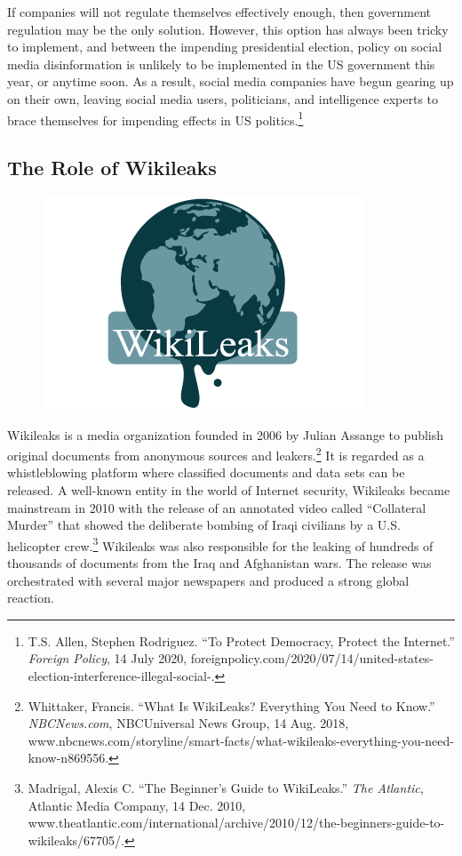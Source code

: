\documentclass[10pt, letterpaper]{article}
\begin{document}
If companies will not regulate themselves effectively enough, then
government regulation may be the only solution. However, this option has
always been tricky to implement, and between the impending presidential
election, policy on social media disinformation is unlikely to be
implemented in the US government this year, or anytime soon. As a
result, social media companies have begun gearing up on their own,
leaving social media users, politicians, and intelligence experts to
brace themselves for impending effects in US politics.\footnote{T.S.
  Allen, Stephen Rodriguez. ``To Protect Democracy, Protect the
  Internet.'' \emph{Foreign Policy}, 14 July 2020,
  foreignpolicy.com/2020/07/14/united-states-election-interference-illegal-social-.} \\

\subsection{The Role of Wikileaks}

\begin{figure}
\centering
\includegraphics[scale = 0.55]{image2.png}
\end{figure}

Wikileaks is a media organization founded in 2006 by Julian Assange to
publish original documents from anonymous sources and
leakers.\footnote{Whittaker, Francis. ``What Is WikiLeaks? Everything
  You Need to Know.'' \emph{NBCNews.com}, NBCUniversal News Group, 14
  Aug. 2018,
  www.nbcnews.com/storyline/smart-facts/what-wikileaks-everything-you-need-know-n869556.}
It is regarded as a whistleblowing platform where classified documents
and data sets can be released. A well-known entity in the world of
Internet security, Wikileaks became mainstream in 2010 with the release
of an annotated video called ``Collateral Murder'' that showed the
deliberate bombing of Iraqi civilians by a U.S. helicopter
crew.\footnote{Madrigal, Alexis C. ``The Beginner's Guide to
  WikiLeaks.'' \emph{The Atlantic}, Atlantic Media Company, 14 Dec.
  2010,
  www.theatlantic.com/international/archive/2010/12/the-beginners-guide-to-wikileaks/67705/.}
Wikileaks was also responsible for the leaking of hundreds of thousands
of documents from the Iraq and Afghanistan wars. The release was
orchestrated with several major newspapers and produced a strong global
reaction.  \\
\end{document}
